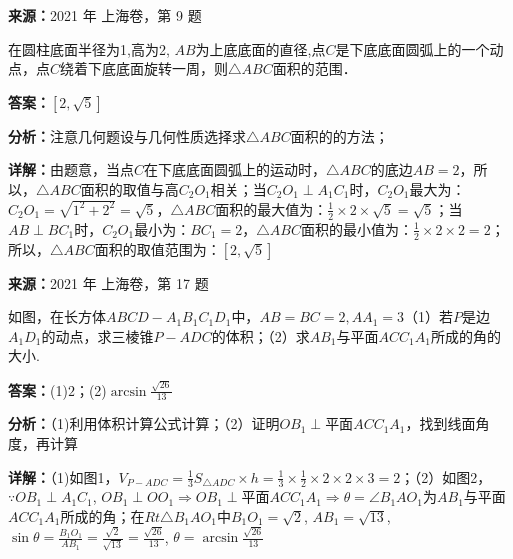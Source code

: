\begin{question}[points=5]
\textbf{来源：}2021 年 上海卷，第 9 题\par
在圆柱底面半径为1,高为2, $AB$为上底底面的直径,点$C$是下底底面圆弧上的一个动点，点$C$绕着下底底面旋转一周，则$\triangle ABC$面积的范围．
\fillin[{$[2,\sqrt{5}]$}]
\begin{solution}
\textbf{答案：}$[2,\sqrt{5}]$

\textbf{分析：}注意几何题设与几何性质选择求$\triangle ABC$面积的的方法；

\textbf{详解：}由题意，当点$C$在下底底面圆弧上的运动时，$\triangle ABC$的底边$AB=2$，所以，$\triangle ABC$面积的取值与高$C_2O_1$相关；当$C_2O_1\perp A_1C_1$时，$C_2O_1$最大为：$C_2O_1=\sqrt{1^2+2^2}=\sqrt{5}$，$\triangle ABC$面积的最大值为：$\frac{1}{2}\times2\times\sqrt{5}=\sqrt{5}$；当$AB\perp BC_1$时，$C_2O_1$最小为：$BC_1=2$，$\triangle ABC$面积的最小值为：$\frac{1}{2}\times2\times2=2$；所以，$\triangle ABC$面积的取值范围为：$[2,\sqrt{5}]$
\end{solution}
\end{question}

\begin{question}[points=14]
\textbf{来源：}2021 年 上海卷，第 17 题\par
如图，在长方体$ABCD-A_1B_1C_1D_1$中，$AB=BC=2, AA_1=3$（1）若$P$是边$A_1D_1$的动点，求三棱锥$P-ADC$的体积；（2）求$AB_1$与平面$ACC_1A_1$所成的角的大小.
\begin{solution}
\textbf{答案：}(1)$2$；(2)$\arcsin\frac{\sqrt{26}}{13}$

\textbf{分析：}（1)利用体积计算公式计算；（2）证明$OB_1\perp$平面$ACC_1A_1$，找到线面角度，再计算

\textbf{详解：}（1)如图1，$V_{P-ADC}=\frac{1}{3}S_{\triangle ADC}\times h=\frac{1}{3}\times\frac{1}{2}\times2\times2\times3=2$；（2）如图2，$\because OB_1\perp A_1C_1$, $OB_1\perp OO_1\Rightarrow OB_1\perp$平面$ACC_1A_1\Rightarrow \theta=\angle B_1AO_1$为$AB_1$与平面$ACC_1A_1$所成的角；在$Rt\triangle B_1AO_1$中$B_1O_1=\sqrt{2}$, $AB_1=\sqrt{13}$, $\sin\theta=\frac{B_1O_1}{AB_1}=\frac{\sqrt{2}}{\sqrt{13}}=\frac{\sqrt{26}}{13}$, $\theta=\arcsin\frac{\sqrt{26}}{13}$
\end{solution}
\end{question}

